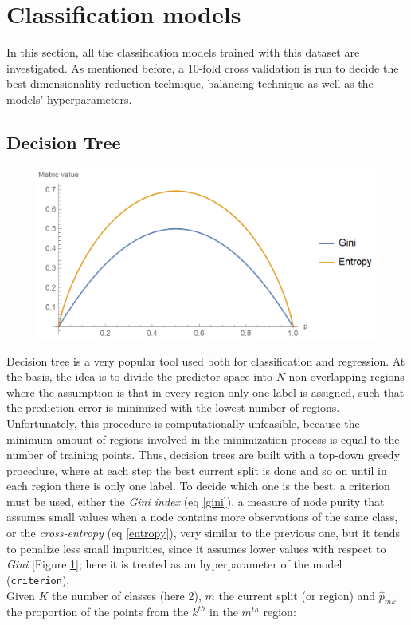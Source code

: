 \documentclass[letterpaper]{article}
\begin{document}
	\section{Classification models} \label{classification}
	In this section, all the classification models trained with this dataset are investigated. As mentioned before, a $10$-fold cross validation is run to decide the best dimensionality reduction technique, balancing technique as well as the models' hyperparameters. 
	\subsection{Decision Tree}
	\begin{figure}[h]
		\centering
		\includegraphics[width=.55\textwidth]{images/gini_vs_entropy.png}
		\label{fig:15}
	\end{figure}
	Decision tree is a very popular tool used both for classification and regression. At the basis, the idea is to divide the predictor space into $N$ non overlapping regions where the assumption is that in every region only one label is assigned, such that the prediction error is minimized with the lowest number of regions. Unfortunately, this procedure is computationally unfeasible, because the minimum amount of regions involved in the minimization process is equal to the number of training points. Thus, decision trees are built with a top-down greedy procedure, where at each step the best current split is done and so on until in each region there is only one label. To decide which one is the best, a criterion must be used, either the \emph{Gini index} (eq \ref{gini}), a measure of node purity that assumes small values when a node contains more observations of the same class, or the \emph{cross-entropy} (eq \ref{entropy}), very similar to the previous one, but it tends to penalize less small impurities, since it assumes lower values with respect to \emph{Gini} [Figure \ref{fig:15}]; here it is treated as an hyperparameter of the model (\texttt{criterion}). \\
	Given $K$ the number of classes (here 2), $m$ the current split (or region) and $\hat{p}_{mk}$ the proportion of the points from the $k^{th}$ in the $m^{th}$ region:
\end{document}

